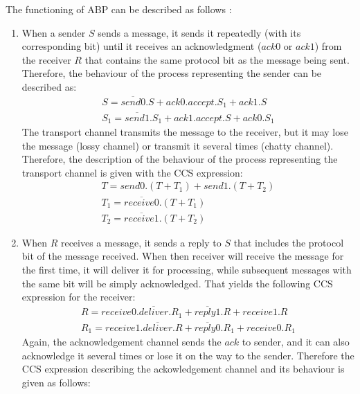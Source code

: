 The functioning of ABP can be described as follows \cite{ReactiveSystems}:
\begin{enumerate}
	\item When a sender $S$ sends a message, it sends it repeatedly (with its corresponding bit) until it receives an acknowledgment ($ack0$ or $ack1$) from the receiver $R$ that contains the same protocol bit as the message being sent. Therefore, the behaviour of the process representing the sender can be described as:
				\begin{equation*}\label{send_imp}
				    \begin{array}{lcl}
							S = \overline{send0}.S+ack0.accept.S_{1}+ack1.S \\
							S_{1}=\overline{send1}.S_{1}+ack1.accept.S+ack0.S_{1}				  
						\end{array}
				\end{equation*}
	      The transport channel transmits the message to the receiver, but it may lose the message (lossy channel) or transmit it several times (chatty channel). Therefore, the description of the behaviour of the process representing the transport channel is given with the CCS expression:
	      \begin{equation*}\label{trans_imp}
	      	\begin{array}{lcl}
						T=send0.\left(T+T_{1}\right)+send1.\left(T+T_{2}\right)\\
						T_{1}=\overline{receive0}.\left(T+T_{1}\right)\\
						T_{2}=\overline{receive1}.\left(T+T_{2}\right)
					\end{array}
				\end{equation*}
  \item When $R$ receives a message, it sends a reply to $S$ that includes the protocol bit of the message received. When then receiver will receive the message for the first time, it will deliver it for processing, while subsequent messages with the same bit will be simply acknowledged. That yields the following CCS expression for the receiver:
  			\begin{equation*}\label{rec_imp}
				    \begin{array}{lcl}
							R=receive0.\overline{deliver}.R_{1}+\overline{reply1}.R+receive1.R \\
							R_{1}=receive1.\overline{deliver}.R+\overline{reply0}.R_{1}+receive0.R_{1}			  
						\end{array}
				\end{equation*}
        Again, the acknowledgement channel sends the $ack$ to sender, and it can also acknowledge it several times or lose it on the way to the sender. Therefore the CCS expression describing the ackowledgement channel and its behaviour is given as follows:

\end{enumerate}
